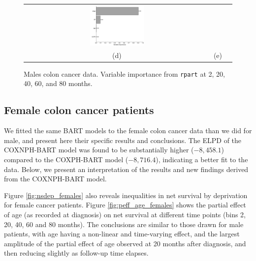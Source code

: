 \documentclass[12pt]{article}
\begin{document}
\begin{figure}[h!]
\begin{tabular}{c c c}
\includegraphics[width=0.3\textwidth]{rpartvimp40_males.pdf} & 
\\
 (d) & (e) & 
 \end{tabular}
\caption{ Males colon cancer data. Variable importance from \texttt{rpart} at 2, 20, 40, 60, and 80 months.}
\label{fig:rpartvimp_males}
\end{figure}

\pagebreak
\subsection{Female colon cancer patients}

We fitted the same BART models to the female colon cancer data than we did for male, and present here their specific results and conclusions.
The ELPD of the COXNPH-BART model was found to be substantially higher ($-8,458.1$) compared to the COXPH-BART model ($-8,716.4$), indicating a better fit to the data. Below, we present an interpretation of the results and new findings derived from the COXNPH-BART model.

Figure \ref{fig:nsdep_females} also reveals inequalities in net survival by deprivation for female cancer patients.
Figure \ref{fig:peff_age_females} shows the partial effect of age (as recorded at diagnosis) on net survival at different time points (bins 2, 20, 40, 60 and 80 months). The conclusions are similar to those drawn for male patients, with age having a non-linear and time-varying effect, and the largest amplitude of the partial effect of age observed at 20 months after diagnosis, and then reducing slightly as follow-up time elapses.
\end{document}
